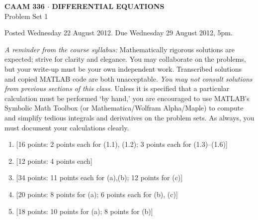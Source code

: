 \documentclass[10pt]{article}
\begin{document}
\vspace*{-5em}
\begin{center}
\large \textsf{\textbf{CAAM 336 $\cdot$ DIFFERENTIAL EQUATIONS}\\[0.5em]
Problem Set 1 }
\end{center}

Posted Wednesday 22 August 2012.  Due Wednesday 29 August 2012, 5pm.

{\small \emph{A reminder from the course syllabus:}  
Mathematically rigorous solutions are expected; strive for clarity and elegance.
You may collaborate on the problems, but your write-up must be your own independent work.
Transcribed solutions and copied MATLAB code are both unacceptable.
\emph{You may not consult solutions from previous sections of this class.}
 Unless it is specified that a particular calculation must be performed `by hand,' you are
encouraged to use MATLAB's Symbolic Math Toolbox (or Mathematica/Wolfram Alpha/Maple)
to compute and simplify tedious integrals and derivatives on the problem sets.
As always, you must document your calculations clearly.}

\begin{enumerate}
\item {[16 points: 2 points each for (1.1), (1.2); 3 points each for (1.3)--(1.6)]}\\  

\vspace*{.5em}
\item {[12 points: 4 points each]}\\  

\vspace*{.5em}
\item {[34 points: 11 points each for (a),(b); 12 points for (c)]}\\  

\vspace*{2em}

\item {[20 points: 8 points for (a); 6 points each for (b), (c)]}\\  

\vspace*{2em}
\item {[18 points: 10 points for (a); 8 points for (b)]}\\  

\end{enumerate}
\end{document}
